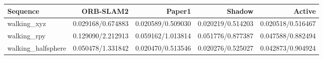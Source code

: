 \begin{table}[t]
\centering
\begin{tabular}{lrrrr}
\toprule
Sequence & ORB-SLAM2 & Paper1 & Shadow & Active \\
\midrule
walking\_xyz & 0.029168/0.674883 & 0.020589/0.509030 & 0.020219/0.514203 & 0.020518/0.516467 \\
walking\_rpy & 0.129090/2.212913 & 0.059162/1.013814 & 0.051776/0.877387 & 0.047588/0.882494 \\
walking\_halfsphere & 0.050478/1.331842 & 0.020470/0.513546 & 0.020276/0.525027 & 0.042873/0.904924 \\
\bottomrule
\end{tabular}
\end{table}
